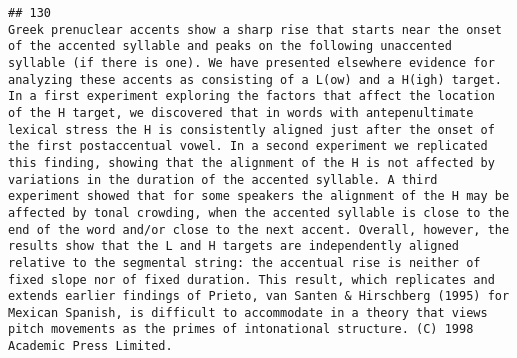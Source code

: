 \documentclass[
  english,
  man]{apa6}
\begin{document}
\begin{verbatim}
## 130                                                                                                                                                                                                                                                                                                                                                                                                                                                                                                                                                                                                                                                                                                                                                                                                                                                                                                                                                                                                                                                                                                                                                                                                                                                                                                      Greek prenuclear accents show a sharp rise that starts near the onset of the accented syllable and peaks on the following unaccented syllable (if there is one). We have presented elsewhere evidence for analyzing these accents as consisting of a L(ow) and a H(igh) target. In a first experiment exploring the factors that affect the location of the H target, we discovered that in words with antepenultimate lexical stress the H is consistently aligned just after the onset of the first postaccentual vowel. In a second experiment we replicated this finding, showing that the alignment of the H is not affected by variations in the duration of the accented syllable. A third experiment showed that for some speakers the alignment of the H may be affected by tonal crowding, when the accented syllable is close to the end of the word and/or close to the next accent. Overall, however, the results show that the L and H targets are independently aligned relative to the segmental string: the accentual rise is neither of fixed slope nor of fixed duration. This result, which replicates and extends earlier findings of Prieto, van Santen & Hirschberg (1995) for Mexican Spanish, is difficult to accommodate in a theory that views pitch movements as the primes of intonational structure. (C) 1998 Academic Press Limited.

\end{verbatim}
\end{document}
